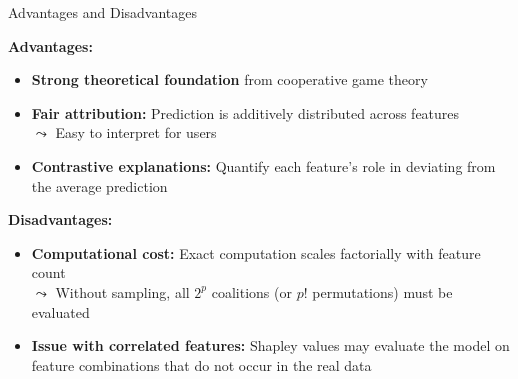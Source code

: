 \documentclass[10pt,compress,t,notes=noshow, xcolor=table]{beamer}
\begin{document}
\begin{frame}{Advantages and Disadvantages}

\textbf{Advantages:}
\begin{itemize}%
  \item \textbf{Strong theoretical foundation} from cooperative game theory
  \item \textbf{Fair attribution:} Prediction is additively distributed across features\\
  $\leadsto$ Easy to interpret for users
  \item \textbf{Contrastive explanations:} Quantify each feature's role in deviating from the average prediction
\end{itemize}

\vspace{0.3cm}

\textbf{Disadvantages:}
\begin{itemize}%
  \item \textbf{Computational cost:} Exact computation scales factorially with feature count\\
  $\leadsto$  Without sampling, all $2^p$ coalitions (or $p!$ permutations) must be evaluated
  \item \textbf{Issue with correlated features:} Shapley values may evaluate the model on feature combinations that do not occur in the real data
\end{itemize}

\end{frame}


\endlecture
\end{document}

